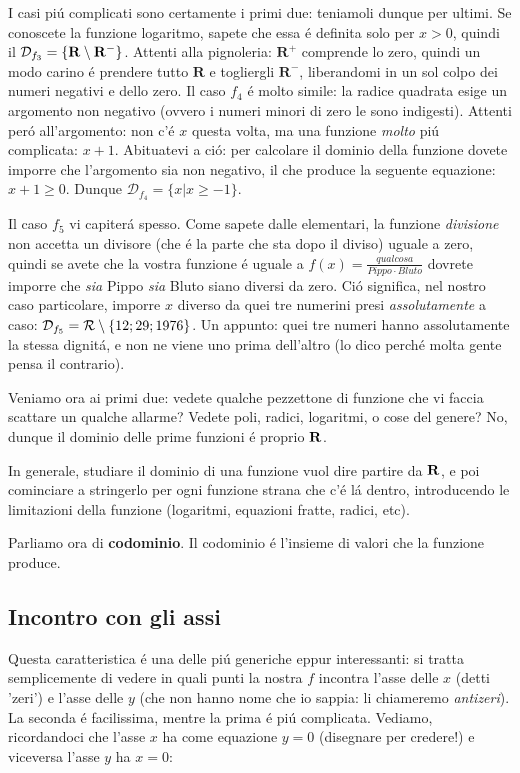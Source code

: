 I casi pi\'u complicati sono certamente i primi due: teniamoli dunque per ultimi. Se conoscete la funzione logaritmo, sapete che essa \'e
definita solo per $x>0$, quindi il $\mathcal{D}_{f_3}=\{\mathbf{R} \setminus \mathbf{R}^-\}$. Attenti alla pignoleria: $\mathbf{R}^+$ comprende
lo zero, quindi un modo carino \'e prendere tutto $\mathbf{R}$ e togliergli $\mathbf{R}^-$, liberandomi in un sol colpo dei numeri negativi e dello zero.
Il caso $f_4$ \'e molto simile: la radice quadrata esige un argomento non negativo (ovvero i numeri minori di zero le sono indigesti). Attenti per\'o
all'argomento: non c'\'e $x$ questa volta, ma una funzione {\em molto} pi\'u complicata: $x+1$. Abituatevi a ci\'o: per calcolare il dominio della
funzione dovete imporre che l'argomento sia non negativo, il che produce la seguente equazione: $x+1 \ge 0$. Dunque $\mathcal{D}_{f_4}=\{x|x \ge -1\}$.

Il caso $f_5$ vi capiter\'a spesso. Come sapete dalle elementari, la funzione {\em divisione} non accetta un divisore (che
\'e la parte che sta dopo il diviso) uguale a zero, quindi se avete che la vostra funzione \'e uguale a
$f(x)=\frac{qualcosa}{Pippo \cdot Bluto}$ dovrete imporre che {\em sia} Pippo {\em sia} Bluto siano diversi da zero.
Ci\'o significa, nel nostro caso particolare, imporre $x$ diverso da quei tre numerini presi {\em assolutamente} a caso:
$\mathcal{D}_{f_5} = \mathcal{R} \setminus \{12;29;1976\}$. Un appunto: quei tre numeri hanno assolutamente la stessa dignit\'a,
e non ne viene uno prima dell'altro (lo dico perch\'e molta gente pensa il contrario).

Veniamo ora ai primi due: vedete qualche pezzettone di funzione che vi faccia scattare un qualche allarme? Vedete poli, radici,
logaritmi, o cose del genere? No, dunque il dominio delle prime funzioni \'e proprio $\mathbf{R}$.

In generale, studiare il dominio di una funzione vuol dire partire da $\mathbf{R}$, e poi cominciare a stringerlo per ogni
funzione strana che c'\'e l\'a dentro, introducendo le limitazioni della funzione (logaritmi, equazioni fratte, radici, etc).

Parliamo ora di {\bf codominio}. Il codominio \'e l'insieme di valori che la funzione produce.

\subsection{Incontro con gli assi}

Questa caratteristica \'e una delle pi\'u generiche eppur interessanti: si tratta semplicemente di vedere in quali punti
la nostra $f$ incontra l'asse delle $x$ (detti 'zeri') e l'asse delle $y$ (che non hanno nome che io sappia: li chiameremo
{\em antizeri}). La seconda \'e facilissima, mentre la prima \'e pi\'u complicata. Vediamo, ricordandoci che l'asse $x$
ha come equazione $y=0$ (disegnare per credere!) e viceversa l'asse $y$ ha $x=0$:

